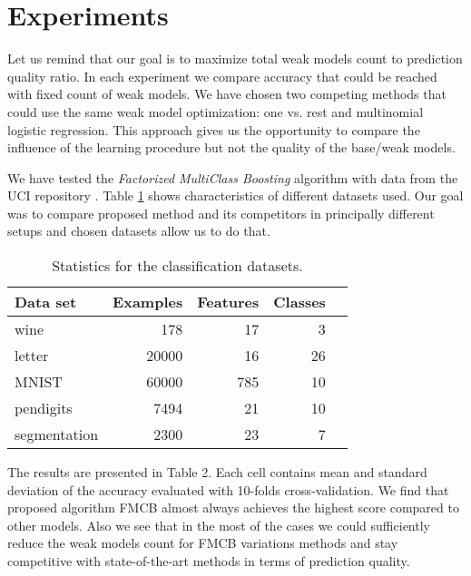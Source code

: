\documentclass{article}
\begin{document}
\section{Experiments} \label{experiments}
Let us remind that our goal is to maximize total weak models count to prediction quality ratio. In each experiment we compare accuracy that could be reached with fixed count of weak models. We have chosen two competing methods that could use the same weak model optimization: one vs. rest and multinomial logistic regression. This approach gives us the opportunity to compare the influence of the learning procedure but not the quality of the base/weak models.

We have tested the \emph{Factorized MultiClass Boosting} algorithm with data from the UCI repository \cite{uciRepo}. Table \ref{datasets} shows characteristics of different datasets used. Our goal was to compare proposed method and its competitors in principally different setups and chosen datasets allow us to do that.

\begin{table}[t]
\caption{Statistics for the classification datasets.}
\label{datasets}
\vskip 0.15in
\begin{center}
\begin{small}
\begin{sc}
\begin{tabular}{lrrrr}
\hline
\abovespace\belowspace
Data set & Examples & Features & Classes \\
\hline
\abovespace
wine     		& 178 	& 17 	& 3     \\
letter    		& 20000 & 16 	& 26 	\\
MNIST     		& 60000 & 785 	& 10    \\
pendigits 		& 7494 	& 21 	& 10 	\\
segmentation    & 2300 	& 23 	& 7     \\
\hline
\end{tabular}
\end{sc}
\end{small}
\end{center}
\vskip -0.1in
\end{table}


 
The results are presented in Table 2. Each cell contains mean and standard deviation of the accuracy evaluated with 10-folds cross-validation. We find that proposed algorithm FMCB almost always achieves the highest score compared to other models. Also we see that in the most of the cases we could sufficiently reduce the weak models count for FMCB variations methods and stay competitive with state-of-the-art methods in terms of prediction quality.
\end{document}

